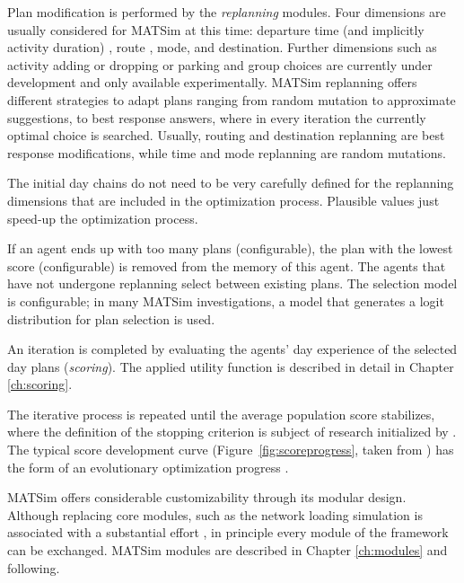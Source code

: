 Plan modification is performed by the \emph{replanning} modules. Four dimensions are usually considered for MATSim at this time: departure time (and implicitly activity duration) \citep[][]{BalmerEtAl_Timmermans_2005}, route \citep[]{LefebvreBalmer_STRC_2007}, mode, and destination. Further dimensions such as activity adding or dropping or parking and group choices are currently under development and only available experimentally. %
MATSim replanning offers different strategies to adapt plans ranging from random mutation to approximate suggestions, to best response answers, where in every iteration the currently optimal choice is searched. Usually, routing and destination replanning are best response modifications, while time and mode replanning are random mutations. 

The initial day chains do not need to be very carefully defined for the replanning dimensions that are included in the optimization process. Plausible values just speed-up the optimization process. 

If an agent ends up with too many plans (configurable), the plan with the lowest score (configurable) is removed from the memory of this agent. The agents that have not undergone replanning select between existing plans. The selection model is configurable; in many MATSim investigations, a model that generates a logit distribution for plan selection is used.

An iteration is completed by evaluating the agents' day experience of the selected day plans (\emph{scoring}). The applied utility function is described in detail in Chapter \ref{ch:scoring}.

The iterative process is repeated until the average population score stabilizes, where the definition of the stopping criterion is subject of research initialized by \citet[][]{Meister_PhDThesis_2011, NagelFloetteroed_IATBR_2009}. The typical score development curve (Figure~\ref{fig:scoreprogress}, taken from \citet[][]{HorniEtAl_TRR_2009}) has the form of an evolutionary optimization progress \citep[][p.]{EibenSmithJE_2003}.

MATSim offers considerable customizability through its modular design. Although replacing core modules, such as the network loading simulation is associated with a substantial effort \citep[][Section 2.4]{MATSim_Userguide_2014}, in principle every module of the framework can be exchanged. MATSim modules are described in Chapter \ref{ch:modules} and following.

